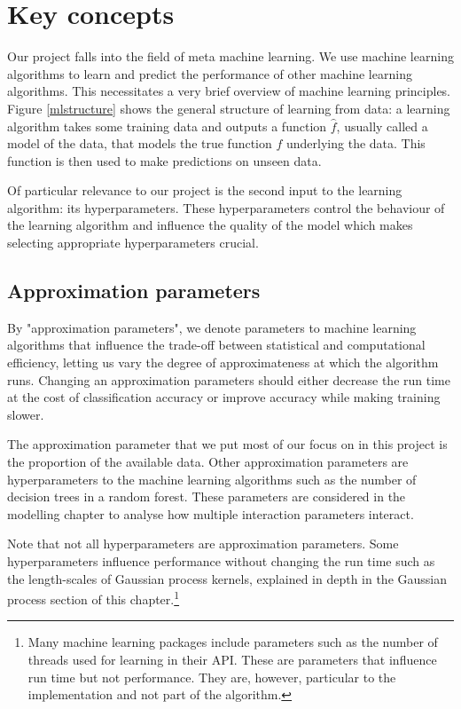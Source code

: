 \documentclass[a4paper,12pt,twoside,openright]{report}
\begin{document}
\section{Key concepts}
Our project falls into the field of meta machine learning. We use machine learning algorithms to learn and predict the performance of other machine learning algorithms. This necessitates a very brief overview of machine learning principles. Figure \ref{mlstructure} shows the general structure of learning from data: a learning algorithm takes some training data and outputs a function $\hat{f}$, usually called a model of the data, that models the true function $f$ underlying the data. This function is then used to make predictions on unseen data.

Of particular relevance to our project is the second input to the learning algorithm: its hyperparameters. These hyperparameters control the behaviour of the learning algorithm and influence the quality of the model which makes selecting appropriate hyperparameters crucial.


\subsection{Approximation parameters}
By "approximation parameters", we denote parameters to machine learning algorithms that influence the trade-off between statistical and computational efficiency, letting us vary the degree of approximateness at which the algorithm runs. Changing an approximation parameters should either decrease the run time at the cost of classification accuracy or improve accuracy while making training slower. 

The approximation parameter that we put most of our focus on in this project is the proportion of the available data. Other approximation parameters are hyperparameters to the machine learning algorithms such as the number of decision trees in a random forest. These parameters are considered in the modelling chapter to analyse how multiple interaction parameters interact.

Note that not all hyperparameters are approximation parameters. Some hyperparameters influence performance without changing the run time such as the length-scales of Gaussian process kernels, explained in depth in the Gaussian process section of this chapter.\footnote{Many machine learning packages include parameters such as the number of threads used for learning in their API. These are parameters that influence run time but not performance. They are, however, particular to the implementation and not part of the algorithm.}
\end{document}
